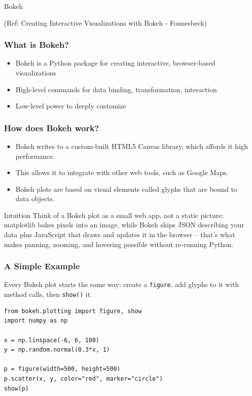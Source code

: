 \begin{frame}[fragile]\frametitle{}
\begin{center}
{\Large Bokeh}

(Ref: Creating Interactive Visualizations with Bokeh - Fonnesbeck)
\end{center}
\end{frame}

\begin{frame}[fragile] \frametitle{What is Bokeh?}
\begin{itemize}
\item Bokeh is a Python package for creating interactive, browser-based visualizations
\item High-level commands for data binding, transformation, interaction
\item Low-level power to deeply customize
\end{itemize}
\end{frame}

\begin{frame}[fragile] \frametitle{How does Bokeh work?}
\begin{itemize}
\item Bokeh writes to a custom-built HTML5 Canvas library, which affords it high performance.
\item This allows it to integrate with other web tools, such as Google Maps.
\item Bokeh plots are based on visual elements called glyphs that are bound to data objects.
\end{itemize}
\begin{block}{Intuition}
Think of a Bokeh plot as a small web app, not a static picture: matplotlib bakes pixels into an image, while Bokeh ships JSON describing your data plus JavaScript that draws and updates it in the browser -- that's what makes panning, zooming, and hovering possible without re-running Python.
\end{block}
\end{frame}

\begin{frame}[fragile] \frametitle{A Simple Example}
Every Bokeh plot starts the same way: create a \texttt{figure}, add glyphs to it with method calls, then \texttt{show()} it.
\begin{lstlisting}
from bokeh.plotting import figure, show
import numpy as np

x = np.linspace(-6, 6, 100)
y = np.random.normal(0.3*x, 1)

p = figure(width=500, height=500)
p.scatter(x, y, color="red", marker="circle")
show(p)
\end{lstlisting}
\end{frame}

